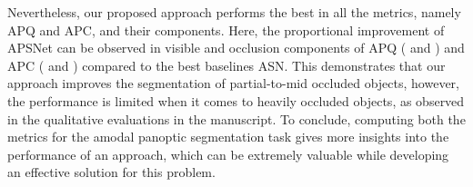 \documentclass[10pt,twocolumn,letterpaper]{article}
\begin{document}
Nevertheless, our proposed approach performs the best in all the metrics, namely APQ and APC, and their components. Here, the proportional improvement of APSNet can be observed in visible and occlusion components of APQ ( and ) and APC ( and ) compared to the best baselines ASN. This demonstrates that our approach improves the segmentation of partial-to-mid occluded objects, however, the performance is limited when it comes to heavily occluded objects, as observed in the qualitative evaluations in the manuscript. To conclude, computing both the metrics for the amodal panoptic segmentation task gives more insights into the performance of an approach, which can be extremely valuable while developing an effective solution for this problem.
\end{document}
